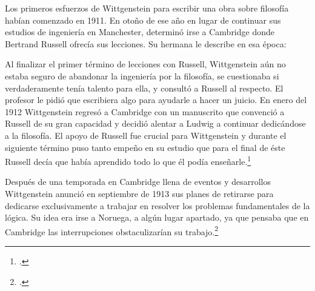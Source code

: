 Los primeros esfuerzos de Wittgenstein para escribir una obra sobre filosofía
habían comenzado en 1911. En otoño de ese año en lugar de continuar sus estudios
de ingeniería en Manchester, determinó irse a Cambridge donde Bertrand Russell
ofrecía sus lecciones. Su hermana le describe en esa época:   

Al finalizar el primer término de lecciones con Russell, Wittgenstein aún no
estaba seguro de abandonar la ingeniería por la filosofía, se cuestionaba si
verdaderamente tenía talento para ella, y consultó a Russell al respecto. El
profesor le pidió que escribiera algo para ayudarle a hacer un juicio. En enero
del 1912 Wittgenstein regresó a Cambridge con un manuscrito que convenció a
Russell de su gran capacidad y decidió alentar a Ludwig a continuar
dedicándose a la filosofía. El apoyo de Russell fue crucial para Wittgenstein y
durante el siguiente término puso tanto empeño en su estudio que para el final
de éste Russell decía que había aprendido todo lo que él podía
enseñarle.\footcite[cap. 3 loc 865]{monk} 

Después de una temporada en Cambridge llena de eventos y desarrollos
Wittgenstein anunció en septiembre de 1913 sus planes de retirarse para
dedicarse exclusivamente a trabajar en resolver los problemas fundamentales de
la lógica. Su idea era irse a Noruega, a algún lugar apartado, ya que pensaba
que en Cambridge las interrupciones obstaculizarían su trabajo.\footcite[cap. 4
loc 1844]{monk} 

